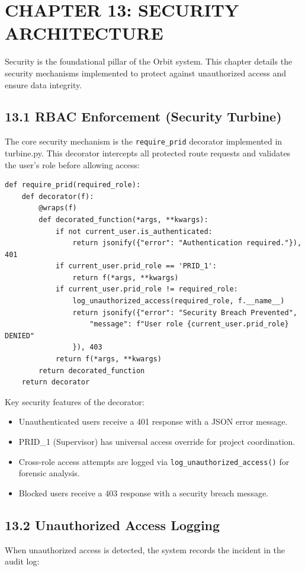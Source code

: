 ﻿\documentclass[12pt]{article}
\def\normaltext{\fontsize{12pt}{18pt}\color{secondary}}
\begin{document}
\section*{{\color{primary}CHAPTER 13: SECURITY ARCHITECTURE}}
\normaltext
Security is the foundational pillar of the Orbit system. This chapter details the security mechanisms implemented to protect against unauthorized access and ensure data integrity.

\subsection*{13.1 RBAC Enforcement (Security Turbine)}
The core security mechanism is the \texttt{require\_prid} decorator implemented in turbine.py. This decorator intercepts all protected route requests and validates the user's role before allowing access:

\begin{lstlisting}[style=pycode]
def require_prid(required_role):
    def decorator(f):
        @wraps(f)
        def decorated_function(*args, **kwargs):
            if not current_user.is_authenticated:
                return jsonify({"error": "Authentication required."}), 401
            if current_user.prid_role == 'PRID_1':
                return f(*args, **kwargs)
            if current_user.prid_role != required_role:
                log_unauthorized_access(required_role, f.__name__)
                return jsonify({"error": "Security Breach Prevented",
                    "message": f"User role {current_user.prid_role} DENIED"
                }), 403
            return f(*args, **kwargs)
        return decorated_function
    return decorator
\end{lstlisting}

Key security features of the decorator:
\begin{itemize}
\item Unauthenticated users receive a 401 response with a JSON error message.
\item PRID\_1 (Supervisor) has universal access override for project coordination.
\item Cross-role access attempts are logged via \texttt{log\_unauthorized\_access()} for forensic analysis.
\item Blocked users receive a 403 response with a security breach message.
\end{itemize}

\subsection*{13.2 Unauthorized Access Logging}
When unauthorized access is detected, the system records the incident in the audit log:
\end{document}
